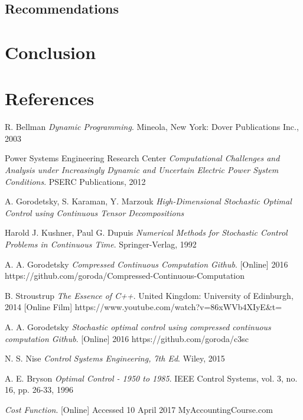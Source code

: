 \documentclass[11pt,draftd]{article}
\begin{document}
\subsection{Recommendations}

\newpage 

\section{Conclusion}

\newpage

\section{References}
\begin{thebibliography}{9}
	R. Bellman
	\textit{Dynamic Programming}. 
	Mineola, New York: Dover Publications Inc., 2003
	
	Power Systems Engineering Research Center
	\textit{Computational Challenges and Analysis under Increasingly Dynamic and Uncertain Electric Power System Conditions}.
	PSERC Publications, 2012
	
	A. Gorodetsky, S. Karaman, Y. Marzouk
	\textit{High-Dimensional Stochastic Optimal Control using Continuous Tensor Decompositions}
	
	Harold J. Kushner, Paul G. Dupuis
	\textit{Numerical Methods for Stochastic Control Problems in Continuous Time}.
	Springer-Verlag, 1992	
	
	A. A. Gorodetsky
	\textit{Compressed Continuous Computation Github}.
	[Online] 2016
	https://github.com/goroda/Compressed-Continuous-Computation
	
	B. Stroustrup
	\textit{The Essence of C++}.
	United Kingdom: University of Edinburgh, 2014
	[Online Film] https://www.youtube.com/watch?v=86xWVb4XIyE\&t=
	
	A. A. Gorodetsky
	\textit{Stochastic optimal control using compressed continuous computation Github}.
	[Online] 2016
	https://github.com/goroda/c3sc
	
	N. S. Nise
	\textit{Control Systems Engineering, 7th Ed}.
	Wiley, 2015
	
	A. E. Bryson 
	\textit{Optimal Control - 1950 to 1985}.
	IEEE Control Systems, vol. 3, no. 16, pp. 26-33, 1996
	
	\textit{Cost Function}.
	[Online] Accessed 10 April 2017
	MyAccountingCourse.com
	

\end{thebibliography}
\end{document}
